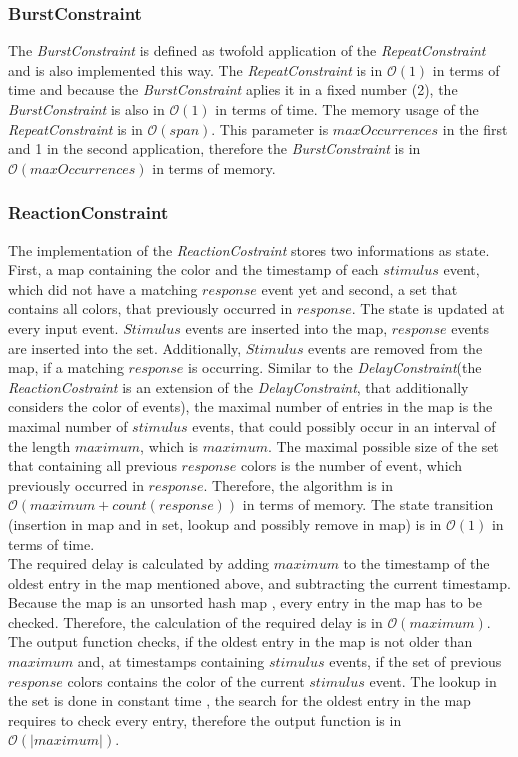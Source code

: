 \subsubsection{BurstConstraint}
	The \emph{BurstConstraint} is defined as twofold application of the \emph{RepeatConstraint} and is also implemented this way. The \emph{RepeatConstraint} is in $\mathcal{O}(1)$ in terms of time and because the \emph{BurstConstraint} aplies it in a fixed number (2), the \emph{BurstConstraint} is also in $\mathcal{O}(1)$ in terms of time. The memory usage of the \emph{RepeatConstraint} is in $\mathcal{O}(span)$. This parameter is $maxOccurrences$ in the first and 1 in the second application, therefore the \emph{BurstConstraint} is in $\mathcal{O}(maxOccurrences)$ in terms of memory.

\subsubsection{ReactionConstraint}
	The implementation of the \emph{ReactionCostraint} stores two informations as state. First, a map containing the color and the timestamp of each $stimulus$ event, which did not have a matching $response$ event yet and second, a set that contains all colors, that previously occurred in $response$. The state is updated at every input event. $Stimulus$ events are inserted into the map, $response$ events are inserted into the set. Additionally, $Stimulus$ events are removed from the map, if a matching $response$ is occurring. Similar to the \emph{DelayConstraint}(the \emph{ReactionCostraint} is an extension of the \emph{DelayConstraint}, that additionally considers the color of events), the maximal number of entries in the map is the maximal number of $stimulus$ events, that could possibly occur in an interval of the length $maximum$, which is $maximum$. The maximal possible size of the set that containing all previous $response$ colors is the number of event, which previously occurred in $response$. Therefore, the algorithm is in $\mathcal{O}(maximum+count(response))$ %
	in terms of memory. The state transition (insertion in map and in set, lookup and possibly remove in map) is in $\mathcal{O}(1)$ in terms of time.\\%
	The required delay is calculated by adding $maximum$ to the timestamp of the oldest entry in the map mentioned above, and subtracting the current timestamp. Because the map is an unsorted hash map%
	, every entry in the map has to be checked. Therefore, the calculation of the required delay is in $\mathcal{O}(maximum)$.\\
	The output function checks, if the oldest entry in the map is not older than $maximum$ and, at timestamps containing $stimulus$ events, if the set of previous $response$ colors contains the color of the current $stimulus$ event. The lookup in the set is done in constant time%
	, the search for the oldest entry in the map requires to check every entry, therefore the output function is in $\mathcal{O}(|maximum|)$.
	
